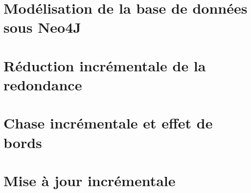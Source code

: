 \section{Modélisation de la base de données sous Neo4J}
\label{sec:update:db}


\section{Réduction incrémentale de la redondance}
\label{sec:update:simplify}


\section{Chase incrémentale et effet de bords}
\label{sec:update:chase}


\section{Mise à jour incrémentale}
\label{sec:update:update}

